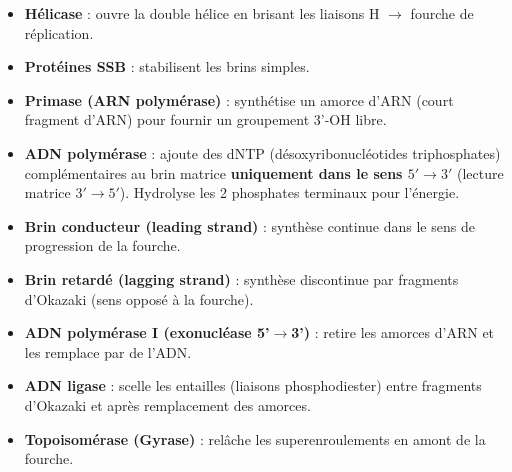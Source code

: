 \documentclass[11pt]{article}
\newcommand{\cle}[1]{{\popxbold\color{popdark}#1}}
\begin{document}
\begin{propriete}
\begin{itemize}
\item \textbf{Hélicase} : ouvre la double hélice en brisant les liaisons H $\rightarrow$ \cle{fourche de réplication}.
\item \textbf{Protéines SSB} : stabilisent les brins simples.
\item \textbf{Primase (ARN polymérase)} : synthétise un \cle{amorce d'ARN} (court fragment d'ARN) pour fournir un groupement 3'-OH libre.
\item \textbf{ADN polymérase} : ajoute des dNTP (désoxyribonucléotides triphosphates) complémentaires au brin matrice \textbf{uniquement dans le sens $5' \rightarrow 3'$} (lecture matrice $3' \rightarrow 5'$). Hydrolyse les 2 phosphates terminaux pour l'énergie.
\item \textbf{Brin conducteur (leading strand)} : synthèse continue dans le sens de progression de la fourche.
\item \textbf{Brin retardé (lagging strand)} : synthèse discontinue par fragments d'\cle{Okazaki} (sens opposé à la fourche).
\item \textbf{ADN polymérase I (exonucléase 5'$\rightarrow$3')} : retire les amorces d'ARN et les remplace par de l'ADN.
\item \textbf{ADN ligase} : scelle les entailles (liaisons phosphodiester) entre fragments d'Okazaki et après remplacement des amorces.
\item \textbf{Topoisomérase (Gyrase)} : relâche les superenroulements en amont de la fourche.
\end{itemize}
\end{propriete}
\end{document}
